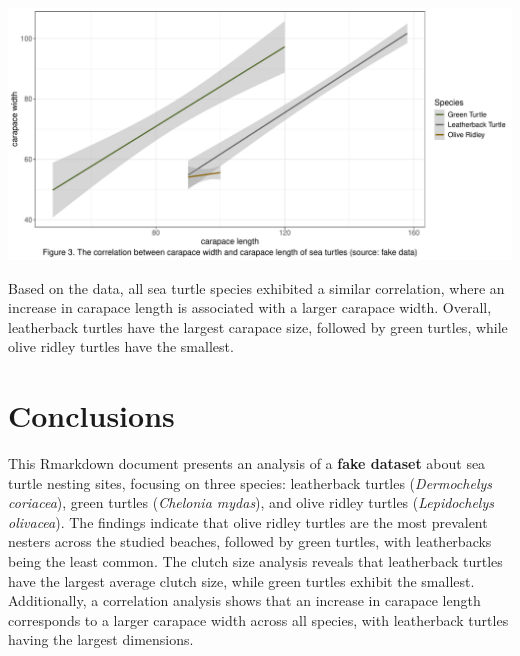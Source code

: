 \documentclass[
]{article}
\begin{document}
\begin{center}\includegraphics{../output/carapace_correlation-1} \end{center}

Based on the data, all sea turtle species exhibited a similar
correlation, where an increase in carapace length is associated with a
larger carapace width. Overall, leatherback turtles have the largest
carapace size, followed by green turtles, while olive ridley turtles
have the smallest.

\hypertarget{conclusions}{%
\section{Conclusions}\label{conclusions}}

This Rmarkdown document presents an analysis of a \textbf{fake dataset}
about sea turtle nesting sites, focusing on three species: leatherback
turtles (\emph{Dermochelys coriacea}), green turtles (\emph{Chelonia
mydas}), and olive ridley turtles (\emph{Lepidochelys olivacea}). The
findings indicate that olive ridley turtles are the most prevalent
nesters across the studied beaches, followed by green turtles, with
leatherbacks being the least common. The clutch size analysis reveals
that leatherback turtles have the largest average clutch size, while
green turtles exhibit the smallest. Additionally, a correlation analysis
shows that an increase in carapace length corresponds to a larger
carapace width across all species, with leatherback turtles having the
largest dimensions.
\end{document}

